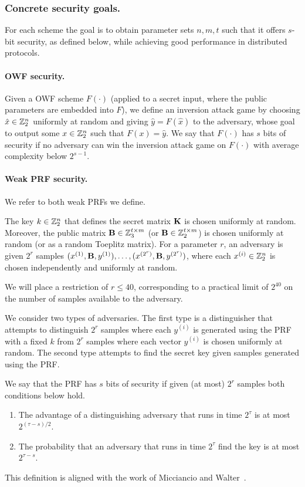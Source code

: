 \subsubsection{Concrete security goals.}
For each scheme the goal is to obtain parameter sets $n,m,t$ such that it offers
$s$-bit security, as defined below, while achieving good performance in distributed protocols.

\paragraph{OWF security.}
Given a OWF scheme $F(\cdot)$ (applied to a secret input, where the public parameters are embedded into $F$),
we define an inversion attack game by choosing $\hat{x} \in \mathbb{Z}_2^n$
uniformly at random and giving $\hat{y}= F(\hat{x})$ to the adversary, whose
goal to output some $x \in \mathbb{Z}_2^n$ such that $F(x) = \hat{y}$.
We say that $F(\cdot)$ has $s$ bits of security if no adversary can win the inversion attack game on $F(\cdot)$ with average complexity below $2^{s-1}$.


\paragraph{Weak PRF security.}
We refer to both weak PRFs we define.

The key $k \in \mathbb{Z}_2^n$ that defines the secret matrix $\mat{K}$ is chosen uniformly at random.
Moreover, the public matrix
$\mat{B} \in \Z_3^{t \times m}$ (or $\mat{B} \in \Z_2^{t \times m}$) is chosen uniformly at random
(or as a random Toeplitz matrix).
For a parameter $r$, an adversary is given $2^{r}$ samples $(x^{(1)},\mat{B},y^{(1)}) ,\ldots, (x^{(2^r)},
\mat{B},y^{(2^r)})$,
where each $x^{(i)} \in \mathbb{Z}_2^n$ is chosen independently and uniformly at random.

We will place a restriction of $r \leq 40$,
corresponding to a practical limit of $2^{40}$ on the number of samples available to the adversary.

We consider two types of adversaries.
The first type is a distinguisher that attempts to distinguish $2^r$ samples where each $y^{(i)}$
is generated using the PRF with a fixed $k$ from
$2^r$ samples where each vector $y^{(i)}$ is chosen uniformly at random.
The second type attempts to find the secret key given samples generated using the PRF.

We say that the PRF has $s$ bits of security if given (at most) $2^r$ samples both conditions below hold.
\begin{enumerate}
  \item The advantage of a distinguishing adversary that runs in time $2^\tau$ is at most $2^{(\tau - s)/2}$.
  \item The probability that an adversary that runs in time $2^\tau$ find the key is at most $2^{\tau - s}$.
\end{enumerate}
This definition is aligned with the work of Micciancio and Walter~\cite{Micciancio018}.

